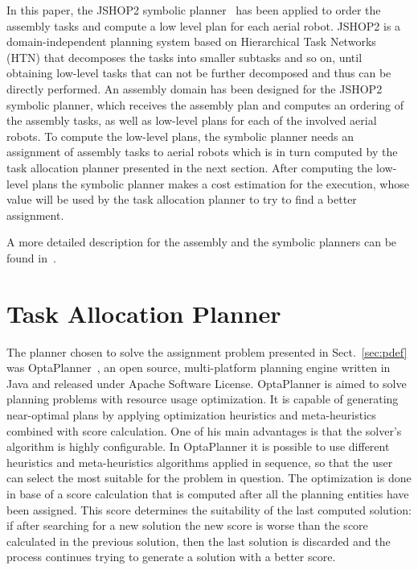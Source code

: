 \documentclass[runningheads,a4paper]{llncs}
\begin{document}
In this paper, the JSHOP2 symbolic planner~\cite{Nau03shop2} has been applied to order the assembly tasks and compute a low level plan for each aerial robot. JSHOP2 is a domain-independent planning system based on Hierarchical Task Networks (HTN) that decomposes the tasks into smaller subtasks and so on, until obtaining low-level tasks that can not be further decomposed and thus can be directly performed. An assembly domain has been designed for the JSHOP2 symbolic planner, which receives the assembly plan and computes an ordering of the assembly tasks, as well as low-level plans for each of the involved aerial robots. To compute the low-level plans, the symbolic planner needs an assignment of assembly tasks to aerial robots which is in turn computed by the task allocation planner presented in the next section. After computing the low-level plans the symbolic planner makes a cost estimation for the execution, whose value will be used by the task allocation planner to try to find a better assignment.

A more detailed description for the assembly and the symbolic planners can be found in~\cite{munoz_icuas15}.

\section{Task Allocation Planner}
    \label{sec:tap} 

The planner chosen to solve the assignment problem presented in Sect.~\ref{sec:pdef} was OptaPlanner~\cite{optaplanner}, an open source, multi-platform planning engine written in Java and released under Apache Software License. OptaPlanner is aimed to solve planning problems with resource usage optimization. It is capable of generating near-optimal plans by applying optimization heuristics and meta-heuristics combined with score calculation. One of his main advantages is that the solver's algorithm is highly configurable. In OptaPlanner it is possible to use different heuristics and meta-heuristics algorithms applied in sequence, so that the user can select the most suitable for the problem in question. The optimization is done in base of a score calculation that is computed after all the planning entities have been assigned. This score determines the suitability of the last computed solution: if after searching for a new solution the new score is worse than the score calculated in the previous solution, then the last solution is discarded and the process continues trying to generate a solution with a better score.
\end{document}
